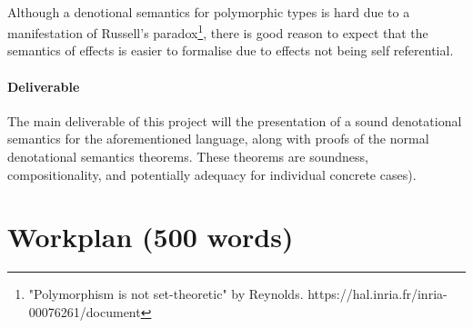 \documentclass[11pt]{article}
\begin{document}
\paragraph{}{
Although a denotional semantics for polymorphic types is hard due to a manifestation of Russell's paradox\footnote{"Polymorphism
is not set-theoretic" by Reynolds. https://hal.inria.fr/inria-00076261/document}, there is good reason to expect that the semantics of effects is easier to formalise due to effects not being self referential.
}




\paragraph{Deliverable}{
The main deliverable of this project will the presentation of a sound denotational semantics for the aforementioned language, along with proofs of the normal denotational semantics theorems. These theorems are soundness, compositionality, and potentially adequacy for individual concrete cases).
}



\section{Workplan (500 words)}
\end{document}
